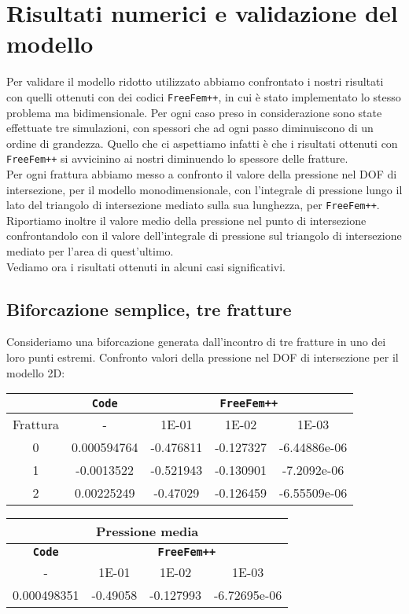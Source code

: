 \chapter{Risultati numerici e validazione del modello} 
Per validare il modello ridotto utilizzato abbiamo confrontato i nostri risultati con quelli ottenuti con dei codici \texttt{FreeFem++}, in cui è stato implementato lo stesso problema ma bidimensionale. Per ogni caso preso in considerazione sono state effettuate tre simulazioni, con spessori che ad ogni passo diminuiscono di un ordine di grandezza. Quello che ci aspettiamo infatti \`{e} che i risultati ottenuti con \texttt{FreeFem++}  si avvicinino ai nostri diminuendo lo spessore delle fratture.\\
\noindent Per ogni frattura abbiamo messo a confronto il valore della pressione nel DOF di intersezione, per il modello monodimensionale, con l'integrale di pressione lungo il lato del triangolo di intersezione mediato sulla sua lunghezza, per \texttt{FreeFem++}.
Riportiamo inoltre il valore medio della pressione nel punto di intersezione confrontandolo con il valore dell'integrale di pressione sul triangolo di intersezione mediato per l'area di quest'ultimo.\\
Vediamo ora i risultati ottenuti in alcuni casi significativi.
\section{Biforcazione semplice, tre fratture}
Consideriamo una biforcazione generata dall'incontro di tre fratture in uno dei loro punti estremi.
Confronto valori della pressione nel DOF di intersezione per il modello 2D:\\
\begin{center}
\begin{tabular}{|c|c|c|c|c|}
\hline
 & \textbf{\texttt{Code}} & \multicolumn{3}{|c|}{\textbf{\texttt{FreeFem++}}} \\
\hline
\multicolumn{1}{|c|}{Frattura} & - &
\multicolumn{1}{|c|}{1E-01} & 1E-02 & 1E-03 \\
\hline
 0 & 0.000594764 & -0.476811 & -0.127327 & -6.44886e-06\\
 1 & -0.0013522 & -0.521943 & -0.130901 & -7.2092e-06\\
 2 & 0.00225249 & -0.47029 & -0.126459 & -6.55509e-06\\
\hline
\end{tabular}
\end{center}

\begin{center}
\begin{tabular}{|c|c|c|c|}
\hline
\multicolumn{4}{|c|}{Pressione media} \\
\hline
\textbf{\texttt{Code}} & \multicolumn{3}{|c|}{\textbf{\texttt{FreeFem++}}} \\
\hline
- & \multicolumn{1}{|c|}{1E-01} & 1E-02 & 1E-03 \\
\hline
0.000498351 & -0.49058 & -0.127993 & -6.72695e-06 \\
\hline
\end{tabular}
\end{center}


